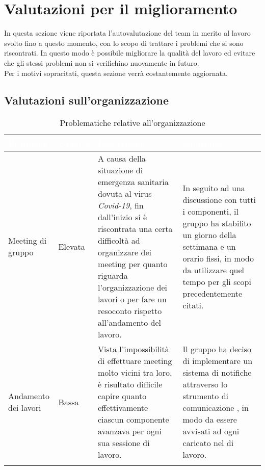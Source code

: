 \section{Valutazioni per il miglioramento}

In questa sezione viene riportata l'autovalutazione del team in merito al lavoro svolto fino a questo momento, con lo scopo di trattare i problemi che si sono riscontrati. In questo modo è possibile migliorare la qualità del lavoro ed evitare che gli stessi problemi non si verifichino nuovamente in futuro.\\Per i motivi sopracitati, questa sezione verrà costantemente aggiornata.

\subsection{Valutazioni sull'organizzazione}

\renewcommand{\arraystretch}{1.5}
\centering
\begin{longtable}{C{2.5cm} C{2.5cm} C{6cm} C{5cm}}
\textcolor{white}{\textbf{Problema}} &
\textcolor{white}{\textbf{Gravità}} &
\textcolor{white}{\textbf{Descrizione}} &	
\textcolor{white}{\textbf{Soluzione}} \\	
\endhead

Meeting di gruppo &
Elevata & 
A causa della situazione di emergenza sanitaria dovuta al virus \textit{Covid-19}, fin dall'inizio si è riscontrata una certa difficoltà ad organizzare dei meeting per quanto riguarda l'organizzazione dei lavori o per fare un resoconto rispetto all'andamento del lavoro. &
In seguito ad una discussione con tutti i componenti, il gruppo ha stabilito un giorno della settimana e un orario fissi, in modo da utilizzare quel tempo per gli scopi precedentemente citati. \\

Andamento dei lavori &
Bassa & 
Vista l'impossibilità di effettuare meeting molto vicini tra loro, è risultato difficile capire quanto effettivamente ciascun componente avanzava per ogni sua sessione di lavoro. &
Il gruppo ha deciso di implementare un sistema di notifiche attraverso lo strumento di comunicazione , in modo da essere avvisati ad ogni  caricato nel  di lavoro. \\

 \caption{Problematiche relative all'organizzazione}
\end{longtable}


